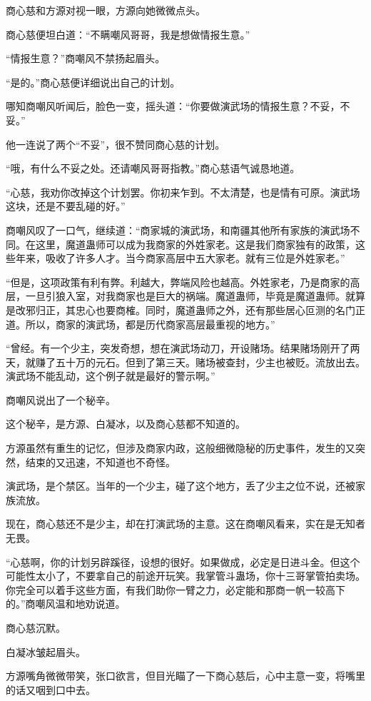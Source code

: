\begin{this_body}
商心慈和方源对视一眼，方源向她微微点头。

商心慈便坦白道：“不瞒嘲风哥哥，我是想做情报生意。”

“情报生意？”商嘲风不禁扬起眉头。

“是的。”商心慈便详细说出自己的计划。

哪知商嘲风听闻后，脸色一变，摇头道：“你要做演武场的情报生意？不妥，不妥。”

他一连说了两个“不妥”，很不赞同商心慈的计划。

“哦，有什么不妥之处。还请嘲风哥哥指教。”商心慈语气诚恳地道。

“心慈，我劝你改掉这个计划罢。你初来乍到。不太清楚，也是情有可原。演武场这块，还是不要乱碰的好。”

商嘲风叹了一口气，继续道：“商家城的演武场，和南疆其他所有家族的演武场不同。在这里，魔道蛊师可以成为我商家的外姓家老。这是我们商家独有的政策，这些年来，吸收了许多人才。当今商家高层中五大家老。就有三位是外姓家老。”

“但是，这项政策有利有弊。利越大，弊端风险也越高。外姓家老，乃是商家的高层，一旦引狼入室，对我商家也是巨大的祸端。魔道蛊师，毕竟是魔道蛊师。就算是改邪归正，其忠心也要商榷。同时，魔道蛊师之外，还有那些居心叵测的名门正道。所以，商家的演武场，都是历代商家高层最重视的地方。”

“曾经。有一个少主，突发奇想，想在演武场动刀，开设赌场。结果赌场刚开了两天，就赚了五十万的元石。但到了第三天。赌场被查封，少主也被贬。流放出去。演武场不能乱动，这个例子就是最好的警示啊。”

商嘲风说出了一个秘辛。

这个秘辛，是方源、白凝冰，以及商心慈都不知道的。

方源虽然有重生的记忆，但涉及商家内政，这般细微隐秘的历史事件，发生的又突然，结束的又迅速，不知道也不奇怪。

演武场，是个禁区。当年的一个少主，碰了这个地方，丢了少主之位不说，还被家族流放。

现在，商心慈还不是少主，却在打演武场的主意。这在商嘲风看来，实在是无知者无畏。

“心慈啊，你的计划另辟蹊径，设想的很好。如果做成，必定是日进斗金。但这个可能性太小了，不要拿自己的前途开玩笑。我掌管斗蛊场，你十三哥掌管拍卖场。你完全可以着手这些方面，有我们助你一臂之力，必定能和那商一帆一较高下的。”商嘲风温和地劝说道。

商心慈沉默。

白凝冰皱起眉头。

方源嘴角微微带笑，张口欲言，但目光瞄了一下商心慈后，心中主意一变，将嘴里的话又咽到口中去。


\end{this_body}
